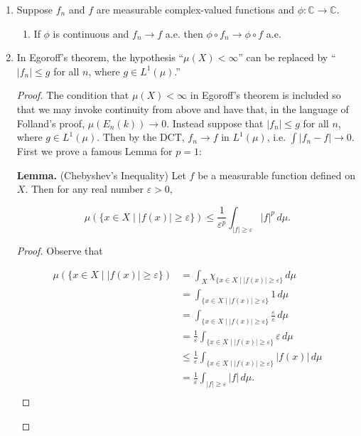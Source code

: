\documentclass[11pt,oneside,english]{amsart}
\theoremstyle{definition}
\newcommand{\ve}{\varepsilon}
\begin{document}
\begin{enumerate}
\begin{proof}
\[
\int f=\int\liminf f_n\leq\liminf \int f_n.
\]
\end{proof}


\setcounter{enumi}{36}

\item Suppose $f_n$ and $f$ are measurable complex-valued functions and $\phi:\mathbb{C}\rightarrow\mathbb{C}$.

\begin{enumerate}
\item If $\phi$ is continuous and $f_n\rightarrow f$ a.e. then $\phi\circ f_n\rightarrow \phi \circ f$ a.e.
\end{enumerate}


\setcounter{enumi}{39}

\item In Egoroff's theorem, the hypothesis ``$\mu(X)<\infty$'' can be replaced by ``$|f_n|\leq g$ for all $n$, where $g\in L^1(\mu)$.''

\begin{proof}
The condition that $\mu(X)<\infty$ in Egoroff's theorem is included so that we may invoke continuity from above and have that, in the language of Folland's proof,  $\mu(E_n(k))\rightarrow 0$. Instead suppose that $|f_n|\leq g$ for all $n$, where $g\in L^1(\mu)$. Then by the DCT, $f_n\rightarrow f$ in $L^1(\mu)$, i.e. $\int |f_n-f|\rightarrow 0$. First we prove a famous Lemma for $p=1$:

\textbf{Lemma.} (Chebyshev's Inequality) Let $f$ be a measurable function defined on $X$. Then for any real number $\ve>0$,

\[
\mu (\{x\in X\mid |f(x)|\geq \ve\})\leq \frac{1}{\ve^p}\int _{|f|\geq \ve}|f|^p\,d\mu.
\]

\begin{proof}
Observe that

\begin{align*}
\mu (\{x\in X\mid |f(x)|\geq \ve\})&=\int_X\chi_{\{x\in X\mid |f(x)|\geq \ve\}}\,d\mu\\[2mm]
&=\int_{\{x\in X\mid |f(x)|\geq \ve\}} 1\,d\mu\\[2mm]
&=\int_{\{x\in X\mid |f(x)|\geq \ve\}}\frac{\ve}{\ve}\,d\mu\\[2mm]
&=\frac{1}{\ve}\int_{\{x\in X\mid |f(x)|\geq \ve\}}\ve\,d\mu\\[2mm]
&\leq\frac{1}{\ve}\int_{\{x\in X\mid |f(x)|\geq \ve\}}|f(x)|\,d\mu\\[2mm]
&=\frac{1}{\ve}\int_{|f|\geq \ve}|f|\,d\mu.\\[2mm]
\end{align*}
\end{proof}


\end{proof}
\end{enumerate}
\end{document}
